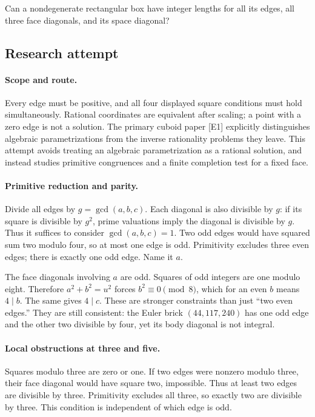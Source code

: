 \documentclass[11pt,a4paper]{article}
\begin{document}
Can a nondegenerate rectangular box have integer lengths for all its edges, all three face diagonals, and its space diagonal?

\subsection{Research attempt}

\paragraph{Scope and route.}
Every edge must be positive, and all four displayed square conditions
must hold simultaneously. Rational coordinates are equivalent after
scaling; a point with a zero edge is not a solution. The primary cuboid
paper [E1] explicitly distinguishes algebraic parametrizations from the
inverse rationality problems they leave. This attempt avoids treating an
algebraic parametrization as a rational solution, and instead studies
primitive congruences and a finite completion test for a fixed face.

\paragraph{Primitive reduction and parity.}
Divide all edges by $g=\gcd(a,b,c)$. Each diagonal is also divisible
by $g$: if its square is divisible by $g^2$, prime valuations imply
the diagonal is divisible by $g$. Thus it suffices to consider
$\gcd(a,b,c)=1$. Two odd edges would have squared sum two modulo four,
so at most one edge is odd. Primitivity excludes three even edges;
there is exactly one odd edge. Name it $a$.

The face diagonals involving $a$ are odd. Squares of odd integers are
one modulo eight. Therefore $a^2+b^2=u^2$ forces $b^2\equiv0\pmod8$,
which for an even $b$ means $4\mid b$. The same gives $4\mid c$.
These are stronger constraints than just ``two even edges.'' They are
still consistent: the Euler brick $(44,117,240)$ has one odd edge and
the other two divisible by four, yet its body diagonal is not integral.

\paragraph{Local obstructions at three and five.}
Squares modulo three are zero or one. If two edges were nonzero modulo
three, their face diagonal would have square two, impossible. Thus at
least two edges are divisible by three. Primitivity excludes all three,
so exactly two are divisible by three. This condition is independent
of which edge is odd.
\end{document}
